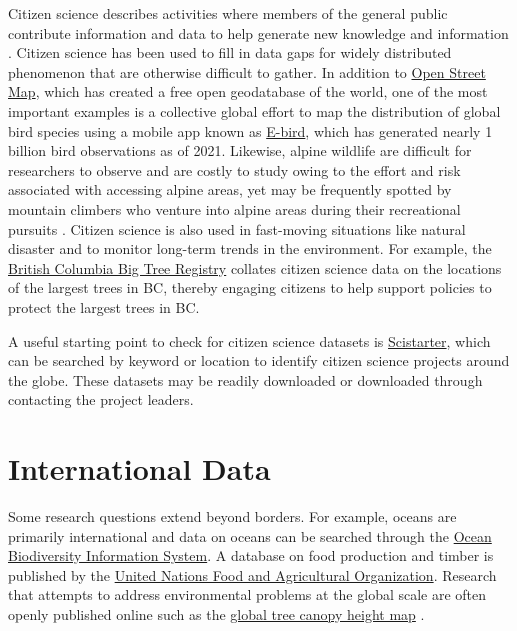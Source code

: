 \documentclass[
]{book}
\begin{document}
Citizen science describes activities where members of the general public contribute information and data to help generate new knowledge and information \citep{lee_review_2020}. Citizen science has been used to fill in data gaps for widely distributed phenomenon that are otherwise difficult to gather. In addition to \href{https://www.openstreetmap.org/}{Open Street Map}, which has created a free open geodatabase of the world, one of the most important examples is a collective global effort to map the distribution of global bird species using a mobile app known as \href{https://ebird.org/home}{E-bird}, which has generated nearly 1 billion bird observations as of 2021. Likewise, alpine wildlife are difficult for researchers to observe and are costly to study owing to the effort and risk associated with accessing alpine areas, yet may be frequently spotted by mountain climbers who venture into alpine areas during their recreational pursuits \citep{jackson_citizen_2015}. Citizen science is also used in fast-moving situations like natural disaster and to monitor long-term trends in the environment. For example, the \href{https://bigtrees.forestry.ubc.ca/bc-bigtree-registry/}{British Columbia Big Tree Registry} collates citizen science data on the locations of the largest trees in BC, thereby engaging citizens to help support policies to protect the largest trees in BC.

A useful starting point to check for citizen science datasets is \href{https://scistarter.org/}{Scistarter}, which can be searched by keyword or location to identify citizen science projects around the globe. These datasets may be readily downloaded or downloaded through contacting the project leaders.

\hypertarget{international-data}{%
\section{International Data}\label{international-data}}

Some research questions extend beyond borders. For example, oceans are primarily international and data on oceans can be searched through the \href{https://obis.org/}{Ocean Biodiversity Information System}. A database on food production and timber is published by the \href{http://www.fao.org/faostat/en/}{United Nations Food and Agricultural Organization}. Research that attempts to address environmental problems at the global scale are often openly published online such as the \href{https://glad.umd.edu/dataset/gedi}{global tree canopy height map} \citep{potapov_mapping_2021}.
\end{document}
